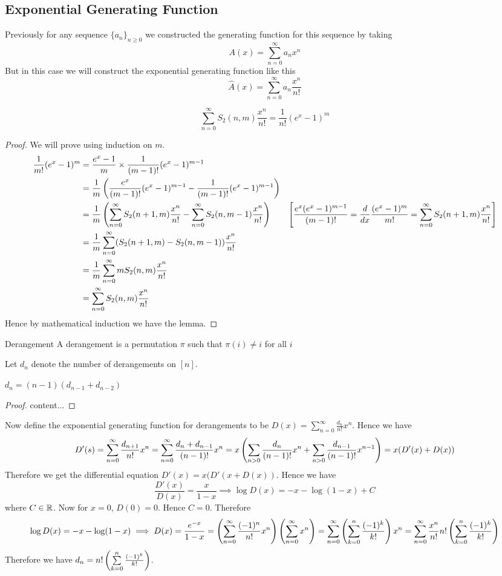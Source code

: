 \subsection{Exponential Generating Function}
Previously for any sequence $\{a_n\}_{n\geq 0}$ we constructed the generating function for this sequence by taking $$A(x)=\sum_{n=0}^{\infty}a_nx^n$$But in this case we will construct the exponential generating function like this $$\hat{A}(x)=\sum_{n=0}^{\infty}a_n\frac{x^n}{n!}$$
\begin{lemma}{}{}
	$$\sum_{n=0}^{\infty}S_2(n,m)\frac{x^n}{n!}=\frac{1}{n!}(e^x-1)^m$$
\end{lemma}
\begin{proof}We will prove using induction on $m$.
	\begin{align*}
		\frac{1}{m!}(e^x-1)^m & = \frac{e^x-1}{m}\times \frac1{(m-1)!}(e^x-1)^{m-1}\\
	& = \frac1m\left(  \frac{e^x}{(m-1)!}(e^x-1)^{m-1}-\frac1{(m-1)!}(e^x-1)^{m-1}  \right)\\
	& = \frac1m\left( \sum_{n=0}^{\infty}S_2(n+1,m)\frac{x^n}{n!}-\sum_{n=0}^{\infty}S_2(n,m-1)\frac{x^n}{n!} \right)&\left[\frac{e^x(e^x-1)^{m-1}}{(m-1)!}=\frac{d}{dx}\frac{(e^x-1)^{m}}{m!}=\sum_{n=0}^{\infty} S_2(n+1,m)\frac{x^n}{n!} \right]\\
	& = \frac1m\sum_{n=0}^{\infty}(S_2(n+1,m)-S_2(n,m-1))\frac{x^n}{n!}\\
	&= \frac1m\sum_{n=0}^{\infty}mS_2(n,m)\frac{x^n}{n!}\\
	&= \sum_{n=0}^{\infty}S_2(n,m)\frac{x^n}{n!}
	\end{align*}Hence by mathematical induction we have the lemma.
\end{proof}
\begin{Definition}{Derangement}{}
	A derangement is a permutation $\pi$ such that $\pi(i)\neq i$ for all $i$
\end{Definition}
Let $d_n$ denote the number of derangements on $[n]$. 
\begin{lemma}{}{}
	$d_n=(n-1)(d_{n-1}+d_{n-2})$
\end{lemma}
\begin{proof}
	content...
\end{proof}

Now define the exponential generating function for derangements to be $D(x)=\sum\limits_{n=0}^{\infty}\frac{d_n}{n!}x^n$. Hence we have $$D'(s)=\sum_{n=0}^{\infty}\frac{d_{n+1}}{n!}x^n=\sum_{n=0}^{\infty}\frac{d_n+d_{n-1}}{(n-1)!}x^n=x\left(\sum_{n>0}\frac{d_n}{(n-1)!}x^n+\sum_{n>0}\frac{d_{n-1}}{(n-1)!}x^{n-1}    \right)=x(D'(x)+D(x))$$Therefore we get the differential equation  $D'(x)=x(D'(x+D(x))$. Hence we have $$\frac{D'(x)}{D(x)}=\frac{x}{1-x}\implies \log D(x)=-x-\log (1-x)+C$$where $C\in\mathbb{R}$. Now for $x=0$, $D(0)=0$. Hence $C=0$. Therefore $$\log D(x)=-x-\log(1-x)\implies D(x)=\frac{e^{-x}}{1-x}=\left(\sum_{n=0}^{\infty}\frac{(-1)^n}{n!}x^n\right)\left(\sum_{n=0}^{\infty}x^n\right)=\sum_{n=0}^{\infty}\left( \sum_{k=0}^n\frac{(-1)^k}{k!} \right)x^n=\sum_{n=0}^{\infty}\frac{x^n}{n!}n!\left( \sum_{k=0}^n\frac{(-1)^k}{k!} \right)$$Therefore we have $ d_n=n!\left( \sum\limits_{k=0}^n\frac{(-1)^k}{k!} \right)$.


